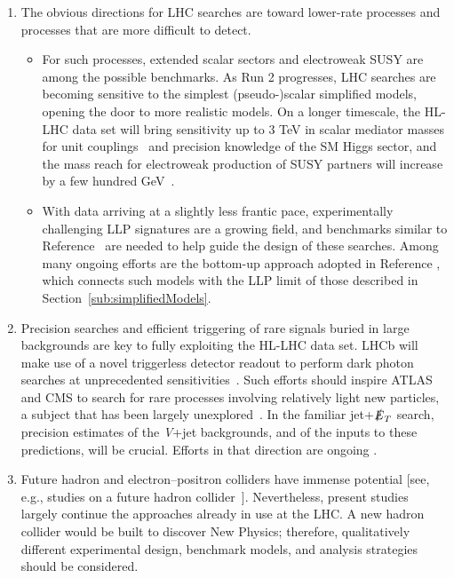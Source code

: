 \documentclass{ar-1col}
\newcommand{\MET}{\ensuremath{\slashed{E}_T}\xspace}
\begin{document}
\begin{issues}
\begin{enumerate}

\item The obvious directions for LHC searches are toward lower-rate
processes and processes that are more difficult to detect.

\begin{itemize}

\item For such processes, extended scalar sectors and electroweak SUSY
are among the possible benchmarks. As Run 2 progresses, LHC searches
are becoming sensitive to the simplest (pseudo-)scalar simplified
models, opening the door to more realistic models. On a longer
timescale, the HL-LHC data set will bring sensitivity up to 3
TeV in scalar mediator masses for unit
couplings~\cite{CMS-PAS-FTR-16-005} and precision knowledge of the
SM Higgs sector, and the mass reach for
electroweak production of SUSY partners will increase by a few hundred
GeV~\cite{Campana:2016cqm}.

\item With data arriving at a slightly less frantic pace, experimentally
challenging LLP signatures are a growing field,
and benchmarks similar to Reference~ are
needed to help guide the design of these searches. Among many
ongoing efforts are the bottom-up approach adopted in
Reference , which connects such models with
the LLP limit of those described in
Section~\ref{sub:simplifiedModels}.

\end{itemize}

\item Precision searches and efficient triggering of rare signals buried
in large backgrounds are key to fully exploiting the HL-LHC data set.
LHCb will make use of a novel triggerless detector readout to
perform dark photon searches at unprecedented
sensitivities~\cite{Ilten:2016tkc}. Such efforts should
inspire ATLAS and CMS to search for rare processes involving
relatively light new particles, a subject that has been largely
unexplored~\cite{Alves:2016cqf}. In the familiar jet+\MET search,
precision estimates of the \textit{V}+jet backgrounds, and of the inputs to
these predictions, will be crucial. Efforts in that
direction are ongoing \cite{Blumenschein:2018gtm}.

\item Future hadron and electron--positron colliders have immense
potential [see, e.g., studies on a future hadron
collider~\cite{Golling:2016gvc}]. Nevertheless, present studies
largely continue the approaches already in use at the LHC. A new
hadron collider would be built to discover New Physics;
therefore, qualitatively different experimental design, benchmark
models, and analysis strategies should be considered.


\end{enumerate}
\end{issues}
\end{document}
